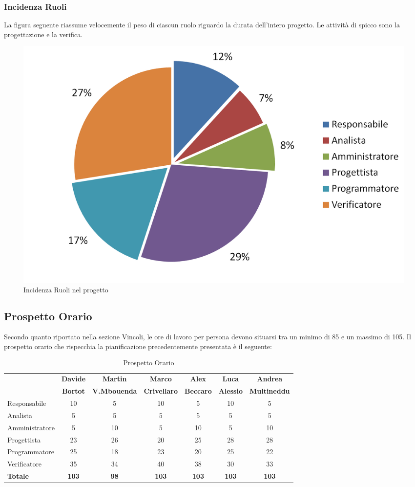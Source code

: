 \documentclass[a4paper,11pt]{article}
\begin{document}
	\subsubsection{Incidenza Ruoli}
	La figura seguente riassume velocemente il peso di ciascun ruolo riguardo la durata dell'intero progetto. Le attività di spicco sono la progettazione e la verifica.
	\begin{figure}[h!]
		\centering
		\includegraphics[scale=0.6]{../Images/pie_chart-Preventivo_Ruoli}
		\caption{Incidenza Ruoli nel progetto}
	\end{figure}
	\newpage
	\subsection{Prospetto Orario}
	Secondo quanto riportato nella sezione Vincoli, le ore di lavoro per persona devono situarsi tra un minimo di 85 e un massimo di 105. Il prospetto orario che rispecchia la pianificazione precedentemente presentata è il seguente:
	\begin{table}[h!]
		\hspace{0.6cm}\begin{tabular}{l c c c c c c}
		 	& \textbf{Davide} & \textbf{Martin} & \textbf{Marco} & \textbf{Alex} & \textbf{Luca} & \textbf{Andrea}\\
			 & \textbf{Bortot} & \textbf{V.Mbouenda} & \textbf{Crivellaro} & \textbf{Beccaro} & \textbf{Alessio} & \textbf{Multineddu}\\
			\midrule
			Responsabile 	& 10 & 5  & 10  & 5  & 10 & 5 \\
			Analista 		& 5  & 5  & 5   & 5  & 5  & 5 \\
			Amministratore 	& 5  & 10 & 5   & 10 & 5  & 10\\
			Progettista 	& 23 & 26 & 20  & 25 & 28 & 28\\
			Programmatore 	& 25 & 18 & 23  & 20 & 25 & 22\\
			Verificatore 	& 35 & 34 & 40  & 38 & 30 & 33\\
			\midrule
			\textbf{Totale} & \textbf{103} & \textbf{98} & \textbf{103} & \textbf{103} & \textbf{103} & \textbf{103}
		\end{tabular}
	\caption{Prospetto Orario}
	\end{table}
	
\end{document}

